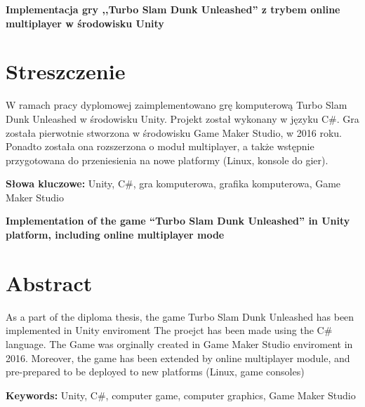 \newpage
\begin{center}
\large \bf
Implementacja gry ,,Turbo Slam Dunk Unleashed'' z trybem online multiplayer w środowisku Unity
\end{center}

\section*{Streszczenie}
W ramach pracy dyplomowej zaimplementowano grę komputerową Turbo Slam Dunk Unleashed w środowisku Unity. Projekt został wykonany w języku C\#. Gra została pierwotnie stworzona w środowisku Game Maker Studio, w 2016 roku. Ponadto została ona rozszerzona o moduł multiplayer, a także wstępnie przygotowana do przeniesienia na nowe platformy (Linux, konsole do gier).

\bigskip
{\noindent\bf Słowa kluczowe:} Unity, C\#, gra komputerowa, grafika komputerowa, Game Maker Studio

\vskip 2cm


\begin{center}
\large \bf
Implementation of the game ``Turbo Slam Dunk Unleashed'' in Unity platform, including online multiplayer mode 
\end{center}

\section*{Abstract}
As a part of the diploma thesis, the game Turbo Slam Dunk Unleashed has been implemented in Unity enviroment The proejct has been made using the C\# language. The Game was orginally created in Game Maker Studio enviroment in 2016. Moreover, the game has been extended by online multiplayer module, and pre-prepared to be deployed to new platforms (Linux, game consoles)

\bigskip
{\noindent\bf Keywords:} Unity, C\#, computer game, computer graphics, Game Maker Studio

\vfill